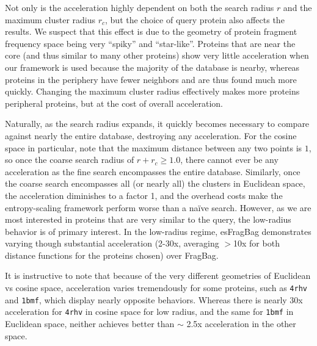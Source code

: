 \documentclass[11pt]{elsarticle}
\theoremstyle{definition}
\theoremstyle{remark}
\numberwithin{equation}{section}
\begin{document}
Not only is the acceleration highly dependent on both the search radius $r$ and the maximum cluster radius $r_c$,
but the choice of query protein also affects the results.
We suspect that this effect is due to the geometry of protein fragment frequency space being very ``spiky'' and ``star-like''.
Proteins that are near the core (and thus similar to many other proteins) show very little acceleration when our framework is used because the majority of the database is nearby, whereas proteins in the periphery have fewer neighbors and are thus found much more quickly.
Changing the maximum cluster radius effectively makes more proteins peripheral proteins, but at the cost of overall acceleration.

Naturally, as the search radius expands, it quickly becomes necessary to compare against nearly the entire database, destroying any acceleration.
For the cosine space in particular, note that the maximum distance between any two points is $1$, so once the coarse search radius of $r+r_c \ge 1.0$, there cannot ever be any acceleration as the fine search encompasses the entire database.
Similarly, once the coarse search encompasses all (or nearly all) the clusters in Euclidean space, the acceleration diminishes to a factor 1, and the overhead costs make the entropy-scaling framework perform worse than a na\"ive search.
However, as we are most interested in proteins that are very similar to the query, the low-radius behavior is of primary interest.
In the low-radius regime, esFragBag demonstrates varying though substantial acceleration (2-30x, averaging $>$10x for both distance functions for the proteins chosen) over FragBag.

It is instructive to note that because of the very different geometries of Euclidean vs cosine space, acceleration varies tremendously for some proteins, such as \texttt{4rhv} and \texttt{1bmf}, which display nearly opposite behaviors.
Whereas there is nearly 30x acceleration for \texttt{4rhv} in cosine space for low radius, and the same for \texttt{1bmf} in Euclidean space, neither achieves better than $\sim$ 2.5x acceleration in the other space.
\end{document}
